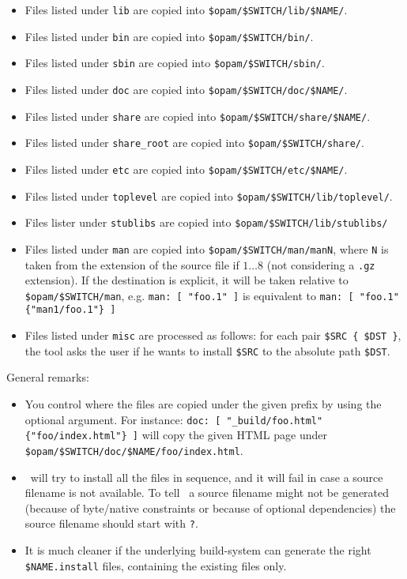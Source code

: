 \documentclass[a4paper,10pt]{article}
\begin{document}
\begin{itemize}
\item Files listed under {\tt lib} are copied into \verb+$opam/$SWITCH/lib/$NAME/+.
\item Files listed under {\tt bin} are copied into \verb+$opam/$SWITCH/bin/+.
\item Files listed under {\tt sbin} are copied into \verb+$opam/$SWITCH/sbin/+.
\item Files listed under {\tt doc} are copied into \verb+$opam/$SWITCH/doc/$NAME/+.
\item Files listed under {\tt share} are copied into \verb+$opam/$SWITCH/share/$NAME/+.
\item Files listed under {\tt share\_root} are copied into \verb+$opam/$SWITCH/share/+.
\item Files listed under {\tt etc} are copied into \verb+$opam/$SWITCH/etc/$NAME/+.
\item Files listed under {\tt toplevel} are copied into \verb+$opam/$SWITCH/lib/toplevel/+.
\item Files lister under {\tt stublibs} are copied into \verb+$opam/$SWITCH/lib/stublibs/+
\item Files listed under {\tt man} are copied into
  \verb+$opam/$SWITCH/man/manN+, where \verb+N+ is taken from the extension of
  the source file if $1\dots8$ (not considering a \verb+.gz+ extension). If the
  destination is explicit, it will be taken relative to
  \verb+$opam/$SWITCH/man+, e.g.
  \verb+man: [ "foo.1" ]+ is equivalent to \verb+man: [ "foo.1" {"man1/foo.1"} ]+
\item Files listed under {\tt misc} are processed as follows:
  for each pair \verb+$SRC { $DST }+, the tool asks the user if
  he wants to install \verb+$SRC+ to the absolute path \verb+$DST+.
\end{itemize}

General remarks:
\begin{itemize}

\item You control where the files are copied under the given prefix by
  using the optional argument. For instance:
  \verb+doc: [ "_build/foo.html" {"foo/index.html"} ]+ will copy the
  given HTML page under \verb+$opam/$SWITCH/doc/$NAME/foo/index.html+.

\item \OPAM\ will try to install all the files in sequence, and it will
  fail in case a source filename is not available. To tell \OPAM\ a
  source filename might not be generated (because of byte/native
  constraints or because of optional dependencies) the source filename
  should start with \verb+?+.

\item It is much cleaner if the underlying build-system can generate
  the right \verb+$NAME.install+ files, containing the existing files only.

\end{itemize}
\end{document}
